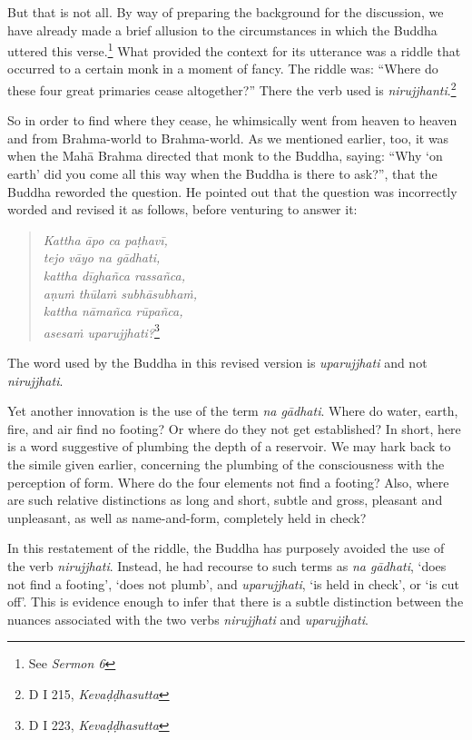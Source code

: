 But that is not all. By way of preparing the background for the discussion, we have already made a brief allusion to the circumstances in which the Buddha uttered this verse.\footnote{See \emph{Sermon 6}} What provided the context for its utterance was a riddle that occurred to a certain monk in a moment of fancy. The riddle was: ``Where do these four great primaries cease altogether?'' There the verb used is \emph{nirujjhanti}.\footnote{D I 215, \emph{Kevaḍḍhasutta}}

So in order to find where they cease, he whimsically went from heaven to heaven and from Brahma-world to Brahma-world. As we mentioned earlier, too, it was when the Mahā Brahma directed that monk to the Buddha, saying: ``Why `on earth' did you come all this way when the Buddha is there to ask?'', that the Buddha reworded the question. He pointed out that the question was incorrectly worded and revised it as follows, before venturing to answer it:

\clearpage

\begin{quote}
\emph{Kattha āpo ca paṭhavī,}\\
\emph{tejo vāyo na gādhati,}\\
\emph{kattha dīghañca rassañca,}\\
\emph{aṇuṁ thūlaṁ subhāsubhaṁ,}\\
\emph{kattha nāmañca rūpañca,}\\
\emph{asesaṁ uparujjhati?}\footnote{D I 223, \emph{Kevaḍḍhasutta}}
\end{quote}

The word used by the Buddha in this revised version is \emph{uparujjhati} and not \emph{nirujjhati}.

Yet another innovation is the use of the term \emph{na gādhati}. Where do water, earth, fire, and air find no footing? Or where do they not get established? In short, here is a word suggestive of plumbing the depth of a reservoir. We may hark back to the simile given earlier, concerning the plumbing of the consciousness with the perception of form. Where do the four elements not find a footing? Also, where are such relative distinctions as long and short, subtle and gross, pleasant and unpleasant, as well as name-and-form, completely held in check?

In this restatement of the riddle, the Buddha has purposely avoided the use of the verb \emph{nirujjhati}. Instead, he had recourse to such terms as \emph{na gādhati}, `does not find a footing', `does not plumb', and \emph{uparujjhati}, `is held in check', or `is cut off'. This is evidence enough to infer that there is a subtle distinction between the nuances associated with the two verbs \emph{nirujjhati} and \emph{uparujjhati}.

